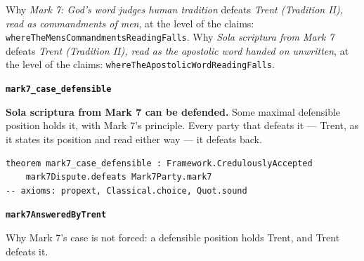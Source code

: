 \documentclass[11pt]{article}
\begin{document}
\noindent Why \emph{Mark 7: God's word judges human tradition} defeats \emph{Trent (Tradition II), read as commandments of men}, at the level of the claims: \texttt{where\allowbreak{}The\allowbreak{}Mens\allowbreak{}Commandments\allowbreak{}Reading\allowbreak{}Falls}.
\noindent Why \emph{Sola scriptura from Mark 7} defeats \emph{Trent (Tradition II), read as the apostolic word handed on unwritten}, at the level of the claims: \texttt{where\allowbreak{}The\allowbreak{}Apostolic\allowbreak{}Word\allowbreak{}Reading\allowbreak{}Falls}.
\par\medskip\noindent\textbf{\texttt{mark7\_\allowbreak{}case\_\allowbreak{}defensible}}\par\nobreak\noindent
\textbf{Sola scriptura from Mark 7 can be defended.} Some maximal defensible position holds it, with Mark 7's principle. Every party that defeats it — Trent, as it states its position and read either way — it defeats back.

{\small\begin{verbatim}
theorem mark7_case_defensible : Framework.CredulouslyAccepted
    mark7Dispute.defeats Mark7Party.mark7
-- axioms: propext, Classical.choice, Quot.sound
\end{verbatim}}
\par\medskip\noindent\textbf{\texttt{mark7\allowbreak{}Answered\allowbreak{}By\allowbreak{}Trent}}\par\nobreak\noindent
Why Mark 7's case is not forced: a defensible position holds Trent, and Trent defeats it.
\end{document}
